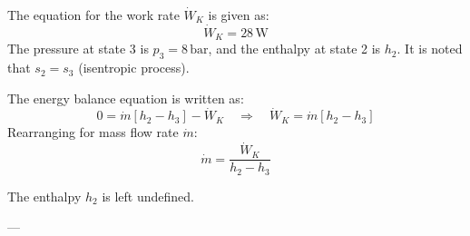 The equation for the work rate \( \dot{W}_K \) is given as:  
\[
\dot{W}_K = 28 \, \text{W}
\]  
The pressure at state 3 is \( p_3 = 8 \, \text{bar} \), and the enthalpy at state 2 is \( h_2 \). It is noted that \( s_2 = s_3 \) (isentropic process).  

The energy balance equation is written as:  
\[
0 = \dot{m} [h_2 - h_3] - \dot{W}_K \quad \Rightarrow \quad \dot{W}_K = \dot{m} [h_2 - h_3]
\]  
Rearranging for mass flow rate \( \dot{m} \):  
\[
\dot{m} = \frac{\dot{W}_K}{h_2 - h_3}
\]  

The enthalpy \( h_2 \) is left undefined.

---